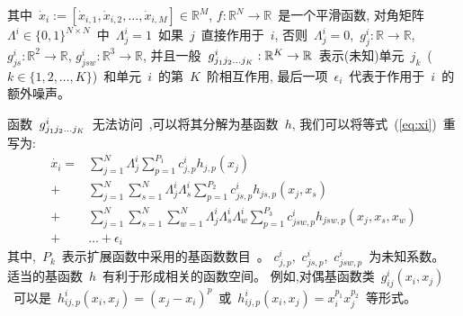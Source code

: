 其中~$\dot{x}_i :=[\dot{x}_{i,1}, \dot{x}_{i,2},\ldots,\dot{x}_{i,M}]\in \mathbb{R}^M$,
$f:\mathbb{R}^N \to \mathbb{R}$~是一个平滑函数, 
对角矩阵~$\Lambda^i \in \{0,1\}^{N \times N}$~中~$\Lambda^i_{j}=1$~如果~$j$~直接作用于~$i$, 
否则~$\Lambda^i_{j}=0$,~$g^i_j:\mathbb{R} \to \mathbb{R}$, $g^i_{js}:\mathbb{R}^2 \to \mathbb{R}$, $g^i_{jsw}:\mathbb{R}^3 \to \mathbb{R}$,
并且一般~$g^i_{j_{1}j_{2}\ldots\\j_{K}}:\mathbb{R}^K \to \mathbb{R}$~表示(未知)单元~$j_k$~($k \in \{1,2,\ldots,K\}$)~和单元~$i$~的第~$K$~阶相互作用, 
最后一项~$\epsilon_{i}$~代表于作用于~$i$~的额外噪声。

函数~$g^i_{j_{1}j_{2}\ldots\\j_{K}}$~无法访问~\cite{casadiego2017model},可以将其分解为基函数~$h$,
我们可以将等式~(\ref{eq:xi})~重写为:
\begin{equation}
\label{eq:xi_with_h}
\begin{split}
\dot{x_i} =  &\sum_{j=1}^{N} \Lambda^i_{j} \sum_{p=1}^{P_1} c^i_{j,p}h_{j,p}(x_j) \\
+ &  \sum_{j=1}^{N} \sum_{s=1}^{N}\Lambda^i_{j}\Lambda^i_{s} \sum_{p=1}^{P_2} c^i_{js,p}h_{js,p}(x_j,x_s) \\
                             + &\sum_{j=1}^{N} \sum_{s=1}^{N} \sum_{w=1}^{N}\Lambda^i_{j}\Lambda^i_{s}\Lambda^i_{w} \sum_{p=1}^{P_3} c^i_{jsw,p}h_{jsw,p}(x_j,x_s,x_w)\\
                             + &\ldots + \epsilon_{i} 
\end{split}
\end{equation}
其中,~$P_k$~表示扩展函数中采用的基函数数目~\cite{friedman2001elements}。
$c^i_{j,p}$,~$c^i_{js,p}$,~$c^i_{jsw,p}$~为未知系数。
适当的基函数~$h$~有利于形成相关的函数空间。
例如,对偶基函数类~$g^i_{ij}(x_i,x_j)$~可以是~$h^i_{ij,p}(x_i,x_j)=(x_j-x_i)^p$~或~$h^i_{ij,p}(x_i,x_j)=x^{p_{1}}_i x^{p_{2}}_j$~等形式。

